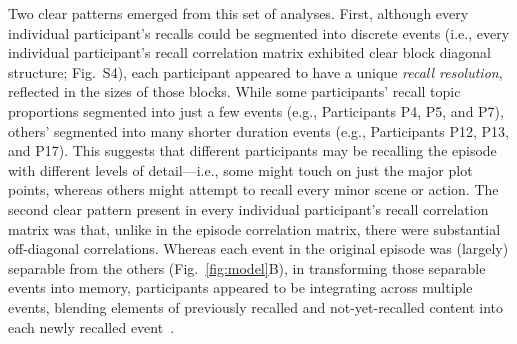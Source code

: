 \documentclass{article}
\newcommand{\corrmats}{S4}
\begin{document}
Two clear patterns emerged from this set of analyses.  First, although every individual participant's recalls could be segmented into discrete events (i.e., every individual participant's recall correlation matrix exhibited clear block diagonal structure; Fig.~\corrmats), each participant appeared to have a unique \textit{recall resolution}, reflected in the sizes of those blocks.  While some participants' recall topic proportions segmented into just a few events (e.g., Participants P4, P5, and P7), others' segmented into many shorter duration events (e.g., Participants P12, P13, and P17).  This suggests that different participants may be recalling the episode with different levels of detail---i.e., some might touch on just the major plot points, whereas others might attempt to recall every minor scene or action.  The second clear pattern present in every individual participant's recall correlation matrix was that, unlike in the episode correlation matrix, there were substantial off-diagonal correlations.  Whereas each event in the original episode was (largely) separable from the others (Fig.~\ref{fig:model}B), in transforming those separable events into memory, participants appeared to be integrating across multiple events, blending elements of previously recalled and not-yet-recalled content into each newly recalled event~\citep[Figs.~\ref{fig:model}E, \corrmats; also see][]{MannEtal11, HowaEtal12, Mann19}.
\end{document}
